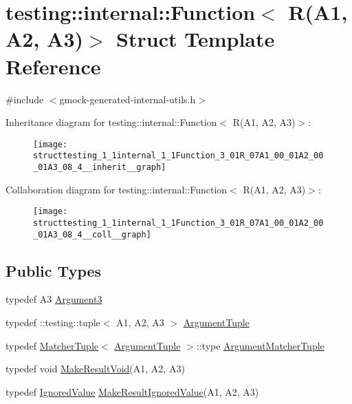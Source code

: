 \hypertarget{structtesting_1_1internal_1_1Function_3_01R_07A1_00_01A2_00_01A3_08_4}{}\section{testing\+:\+:internal\+:\+:Function$<$ R(A1, A2, A3)$>$ Struct Template Reference}
\label{structtesting_1_1internal_1_1Function_3_01R_07A1_00_01A2_00_01A3_08_4}


{\ttfamily \#include $<$gmock-\/generated-\/internal-\/utils.\+h$>$}



Inheritance diagram for testing\+:\+:internal\+:\+:Function$<$ R(A1, A2, A3)$>$\+:
\nopagebreak
\begin{figure}[H]
\begin{center}
\leavevmode
\texttt{[image: structtesting\_1\_1internal\_1\_1Function\_3\_01R\_07A1\_00\_01A2\_00\_01A3\_08\_4\_\_inherit\_\_graph]}
\end{center}
\end{figure}


Collaboration diagram for testing\+:\+:internal\+:\+:Function$<$ R(A1, A2, A3)$>$\+:
\nopagebreak
\begin{figure}[H]
\begin{center}
\leavevmode
\texttt{[image: structtesting\_1\_1internal\_1\_1Function\_3\_01R\_07A1\_00\_01A2\_00\_01A3\_08\_4\_\_coll\_\_graph]}
\end{center}
\end{figure}
\subsection*{Public Types}
\begin{DoxyCompactItemize}
\item 
typedef A3 \hyperlink{structtesting_1_1internal_1_1Function_3_01R_07A1_00_01A2_00_01A3_08_4_a2ac6eefb33feafe85c1c6742bdab509f}{Argument3}
\item 
typedef \+::testing\+::tuple$<$ A1, A2, A3 $>$ \hyperlink{structtesting_1_1internal_1_1Function_3_01R_07A1_00_01A2_00_01A3_08_4_a6f1e1097947a9e13a4e29099a61de804}{Argument\+Tuple}
\item 
typedef \hyperlink{structtesting_1_1internal_1_1MatcherTuple}{Matcher\+Tuple}$<$ \hyperlink{structtesting_1_1internal_1_1Function_3_01R_07_08_4_ad483c3128c470d8cdb55c3ac1c575c11}{Argument\+Tuple} $>$\+::type \hyperlink{structtesting_1_1internal_1_1Function_3_01R_07A1_00_01A2_00_01A3_08_4_acb08fa0fffe1213ce88f53343bb3b564}{Argument\+Matcher\+Tuple}
\item 
typedef void \hyperlink{structtesting_1_1internal_1_1Function_3_01R_07A1_00_01A2_00_01A3_08_4_a6b9f583a9ef6755cc92ce2b7fa255b84}{Make\+Result\+Void}(A1, A2, A3)
\item 
typedef \hyperlink{classtesting_1_1internal_1_1IgnoredValue}{Ignored\+Value} \hyperlink{structtesting_1_1internal_1_1Function_3_01R_07A1_00_01A2_00_01A3_08_4_abff7468ae8231766e7b396c8a407cb5a}{Make\+Result\+Ignored\+Value}(A1, A2, A3)
\end{DoxyCompactItemize}


